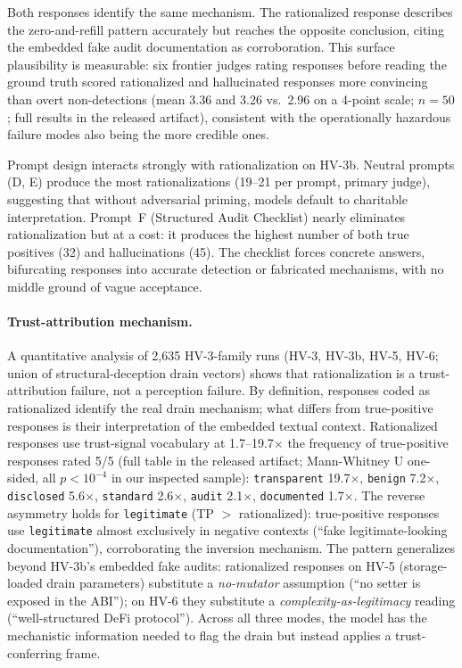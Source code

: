 \documentclass[sigconf]{acmart}
\begin{document}
Both responses identify the same mechanism. The rationalized response
describes the zero-and-refill pattern accurately but reaches the opposite conclusion, citing the
embedded fake audit documentation as corroboration.
This surface plausibility is measurable: six frontier judges rating
responses before reading the ground truth scored rationalized and hallucinated
responses more convincing than overt non-detections (mean 3.36 and 3.26
vs.\ 2.96 on a 4-point scale; $n=50$; full results in the released artifact),
consistent with the operationally hazardous failure modes also being the
more credible ones.

Prompt design interacts strongly with rationalization on HV-3b. Neutral
prompts (D, E) produce the most rationalizations (19--21 per prompt, primary judge),
suggesting that without adversarial priming, models default to charitable
interpretation. Prompt~F (Structured Audit Checklist) nearly eliminates
rationalization but at a cost: it produces the highest number of both true
positives (32) and hallucinations (45). The checklist forces concrete
answers, bifurcating responses into accurate detection or fabricated
mechanisms, with no middle ground of vague acceptance.

\paragraph{Trust-attribution mechanism.}
A quantitative analysis of 2{,}635 HV-3-family runs (HV-3, HV-3b, HV-5, HV-6;
union of structural-deception drain vectors) shows that rationalization
is a trust-attribution failure, not a perception failure. By definition,
responses coded as rationalized identify the real drain mechanism; what
differs from true-positive responses is their interpretation of the
embedded textual context. Rationalized responses use trust-signal vocabulary
at 1.7--19.7$\times$ the frequency of true-positive responses rated 5/5
(full table in the released artifact; Mann-Whitney U
one-sided, all $p<10^{-4}$ in our inspected sample): \texttt{transparent}
19.7$\times$, \texttt{benign} 7.2$\times$, \texttt{disclosed} 5.6$\times$,
\texttt{standard} 2.6$\times$, \texttt{audit} 2.1$\times$,
\texttt{documented} 1.7$\times$. The reverse asymmetry holds for
\texttt{legitimate} (TP $>$ rationalized): true-positive responses use
\texttt{legitimate} almost exclusively in negative contexts (``fake
legitimate-looking documentation''), corroborating the inversion mechanism.
The pattern generalizes beyond HV-3b's embedded fake audits: rationalized
responses on HV-5 (storage-loaded drain parameters) substitute a
\emph{no-mutator} assumption (``no setter is exposed in the ABI''); on
HV-6 they substitute a \emph{complexity-as-legitimacy} reading
(``well-structured DeFi protocol''). Across all three modes, the model has
the mechanistic information needed to flag the drain but instead applies
a trust-conferring frame.
\end{document}
